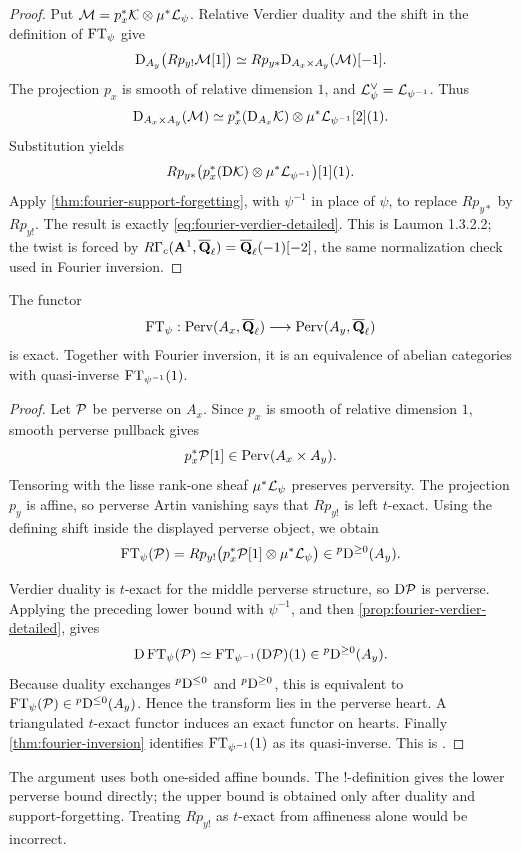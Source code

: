 \begin{proof}
Put
\(\mathcal M=p_x^*\mathcal K\otimes\mu^*\mathcal L_\psi\).
Relative Verdier duality and the shift in the definition of \(\operatorname{FT}_\psi\)
give
\[
 \mathrm D_{A_y}\bigl(Rp_{y!}\mathcal M[1]\bigr)
 \simeq Rp_{y*}\mathrm D_{A_x\times A_y}(\mathcal M)[-1].
\]
The projection \(p_x\) is smooth of relative dimension \(1\), and
\(\mathcal L_\psi^\vee=\mathcal L_{\psi^{-1}}\).  Thus
\[
 \mathrm D_{A_x\times A_y}(\mathcal M)
 \simeq
 p_x^*(\mathrm D_{A_x}\mathcal K)\otimes\mu^*\mathcal L_{\psi^{-1}}[2](1).
\]
Substitution yields
\[
 Rp_{y*}\bigl(
 p_x^*(\mathrm D\mathcal K)\otimes\mu^*\mathcal L_{\psi^{-1}}\bigr)[1](1).
\]
Apply \cref{thm:fourier-support-forgetting}, with
\(\psi^{-1}\) in place of \(\psi\), to replace \(Rp_{y*}\) by
\(Rp_{y!}\).  The result is exactly
\eqref{eq:fourier-verdier-detailed}.  This is Laumon
1.3.2.2; the twist is forced by
\(R\Gamma_c(\mathbf A^1,\overline{\mathbf Q}_\ell)=\overline{\mathbf Q}_\ell(-1)[-2]\), the same normalization check used
in Fourier inversion.
\end{proof}

\begin{theorem}
\label{thm:fourier-perverse-texact-detailed}
The functor
\[
 \operatorname{FT}_\psi:\operatorname{Perv}(A_x,\overline{\mathbf Q}_\ell)\longrightarrow\operatorname{Perv}(A_y,\overline{\mathbf Q}_\ell)
\]
is exact.  Together with Fourier inversion, it is an equivalence of abelian
categories with quasi-inverse \(\operatorname{FT}_{\psi^{-1}}(1)\).
\end{theorem}

\begin{proof}
Let \(\mathcal P\) be perverse on \(A_x\).  Since \(p_x\) is smooth of relative
dimension \(1\), smooth perverse pullback gives
\[
 p_x^*\mathcal P[1]\in\operatorname{Perv}(A_x\times A_y).
\]
Tensoring with the lisse rank-one sheaf
\(\mu^*\mathcal L_\psi\) preserves perversity.  The projection \(p_y\) is affine,
so perverse Artin vanishing says that \(Rp_{y!}\) is left \(t\)-exact.
Using the defining shift inside the displayed perverse object, we obtain
\[
 \operatorname{FT}_\psi(\mathcal P)
 =Rp_{y!}\bigl(p_x^*\mathcal P[1]\otimes\mu^*\mathcal L_\psi\bigr)
 \in{}^p\mathrm D^{\geq0}(A_y).
\]

Verdier duality is \(t\)-exact for the middle perverse structure, so
\(\mathrm D\mathcal P\) is perverse.  Applying the preceding lower bound with
\(\psi^{-1}\), and then \cref{prop:fourier-verdier-detailed}, gives
\[
 \mathrm D\operatorname{FT}_\psi(\mathcal P)
 \simeq\operatorname{FT}_{\psi^{-1}}(\mathrm D\mathcal P)(1)
 \in{}^p\mathrm D^{\geq0}(A_y).
\]
Because duality exchanges
\({}^p\mathrm D^{\leq0}\) and \({}^p\mathrm D^{\geq0}\), this is equivalent to
\(\operatorname{FT}_\psi(\mathcal P)\in{}^p\mathrm D^{\leq0}(A_y)\).  Hence the transform lies in the
perverse heart.  A triangulated \(t\)-exact functor induces an exact functor
on hearts.  Finally \cref{thm:fourier-inversion} identifies
\(\operatorname{FT}_{\psi^{-1}}(1)\) as its quasi-inverse.  This is
\cite[Thm.~1.3.2.3]{LaumonFourier}.
\end{proof}

\begin{perversebox}
The argument uses both one-sided affine bounds.  The \(!\)-definition gives
the lower perverse bound directly; the upper bound is obtained only after
duality and support-forgetting.  Treating \(Rp_{y!}\) as \(t\)-exact from
affineness alone would be incorrect.
\end{perversebox}
